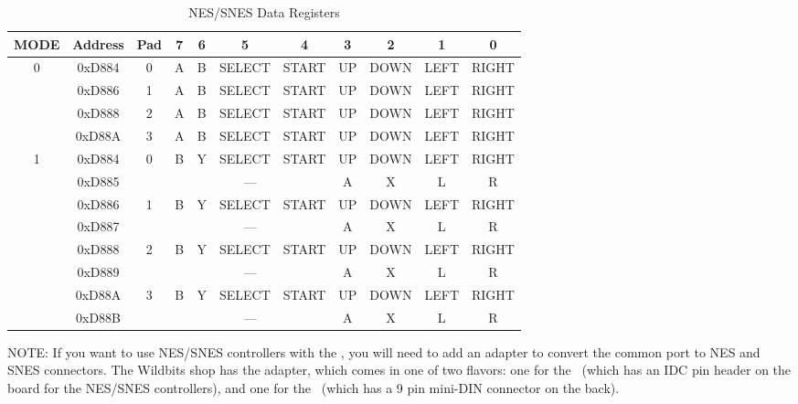 \begin{table}[ht]
    \begin{center}
        \begin{tabular}{|c|c|c|c|c|c|c|c|c|c|c|} \hline
            MODE & Address & Pad & 7 & 6 & 5 & 4 & 3 & 2 & 1 & 0 \\\hline\hline
            \multirow{4}{*}{0} & 0xD884 & 0 & A & B & SELECT & START & UP & DOWN & LEFT & RIGHT \\\cline{2-11}
                & 0xD886 & 1 & A & B & SELECT & START & UP & DOWN & LEFT & RIGHT \\\cline{2-11}
                & 0xD888 & 2 & A & B & SELECT & START & UP & DOWN & LEFT & RIGHT \\\cline{2-11}
                & 0xD88A & 3 & A & B & SELECT & START & UP & DOWN & LEFT & RIGHT \\\hline\hline

            \multirow{8}{*}{1} & 0xD884 & \multirow{2}{*}{0} & B & Y & SELECT & START & UP & DOWN & LEFT & RIGHT \\\cline{2-2}\cline{4-11}
                               & 0xD885 &                    & \multicolumn{4}{|c|}{---} & A & X & L & R \\\cline{2-11}
                               & 0xD886 & \multirow{2}{*}{1} & B & Y & SELECT & START & UP & DOWN & LEFT & RIGHT \\\cline{2-2}\cline{4-11}
                               & 0xD887 &                    & \multicolumn{4}{|c|}{---} & A & X & L & R \\\cline{2-11}
                               & 0xD888 & \multirow{2}{*}{2} & B & Y & SELECT & START & UP & DOWN & LEFT & RIGHT \\\cline{2-2}\cline{4-11}
                               & 0xD889 &                    & \multicolumn{4}{|c|}{---} & A & X & L & R \\\cline{2-11}
                               & 0xD88A & \multirow{2}{*}{3} & B & Y & SELECT & START & UP & DOWN & LEFT & RIGHT \\\cline{2-2}\cline{4-11}
                               & 0xD88B &                    & \multicolumn{4}{|c|}{---} & A & X & L & R \\\hline
        \end{tabular}
    \end{center}
    \caption{NES/SNES Data Registers}
    \label{tab:nes_data_reg}
\end{table}

NOTE: If you want to use NES/SNES controllers with the \jr, you will need to add an adapter to convert the common port to NES and SNES connectors. The Wildbits shop has the adapter, which comes in one of two flavors: one for the \jr\ (which has an IDC pin header on the board for the NES/SNES controllers), and one for the \fk\ (which has a 9 pin mini-DIN connector on the back).